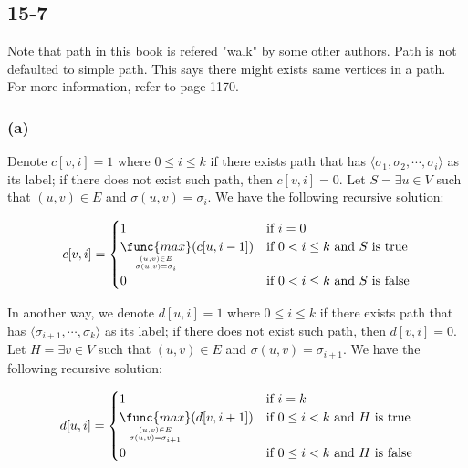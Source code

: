 \subsection*{15-7}

\noindent
Note that path in this book is refered "walk" by some other authors.
Path is not defaulted to simple path.
This says there might exists same vertices in a path.
For more information, refer to page 1170.

\subsubsection*{(a)}

\noindent
Denote $c[v,i] = 1$ where $0 \leq i \leq k$ 
if there exists path that has 
$\langle \sigma_1, \sigma_2, \cdots, \sigma_i \rangle$ 
as its label; 
if there does not exist such path, then $c[v,i] = 0$.
Let $S = \exists u \in V$ such that $(u,v) \in E$ and $\sigma(u,v) = \sigma_i$.
We have the following recursive solution:

\begin{equation*}
    c[v,i] = 
    \begin{cases}
        1 & \text{if } i = 0 \\
        \mathop{\func{max}}\limits_{(u,v) \in E 
            \atop \sigma(u,v) = \sigma_i}
            (c[u,i-1])
            & \text{if } 0 < i \leq k \text{ and } S \text{ is true} \\
        0 & \text{if } 0 < i \leq k \text{ and } S \text{ is false}
    \end{cases}
\end{equation*}

\noindent
In another way,
we denote $d[u,i]=1$ where $0 \leq i \leq k$
if there exists path that has 
$\langle \sigma_{i+1}, \cdots, \sigma_k \rangle$ 
as its label; 
if there does not exist such path, then $d[v,i] = 0$.
Let $H = \exists v \in V$ such that $(u,v) \in E$ and $\sigma(u,v) = \sigma_{i+1}$.
We have the following recursive solution:

\begin{equation*}
    d[u,i] = 
    \begin{cases}
        1 & \text{if } i = k \\
        \mathop{\func{max}}\limits_{(u,v) \in E 
            \atop \sigma(u,v) = \sigma_{i+1}}
            (d[v,i+1])
            & \text{if } 0 \leq i < k \text{ and } H \text{ is true} \\
        0 & \text{if } 0 \leq i < k \text{ and } H \text{ is false}
    \end{cases}
\end{equation*}

